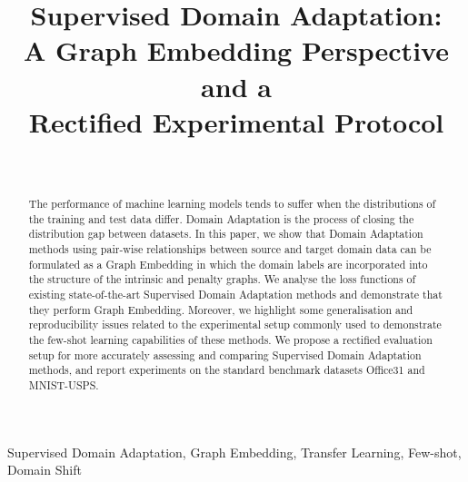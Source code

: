 \documentclass[journal]{IEEEtran}
\begin{document}
\title{Supervised Domain Adaptation:\\A Graph Embedding Perspective and a\\Rectified Experimental Protocol}





\author{
    \\
}





\maketitle



\begin{abstract}
The performance of machine learning models tends to suffer when the distributions of the training and test data differ. Domain Adaptation is the process of closing the distribution gap between datasets. 
In this paper, we show that Domain Adaptation methods using pair-wise relationships between source and target domain data can be formulated as a Graph Embedding in which the domain labels are incorporated into the structure of the intrinsic and penalty graphs.
We analyse the loss functions of existing state-of-the-art Supervised Domain Adaptation methods and demonstrate that they perform Graph Embedding. 
Moreover, we highlight some generalisation and reproducibility issues related to the experimental setup commonly used to demonstrate the few-shot learning capabilities of these methods. We propose a rectified evaluation setup for more accurately assessing and comparing Supervised Domain Adaptation methods, and report experiments on the standard benchmark datasets Office31 and MNIST-USPS.
\end{abstract}

\begin{IEEEkeywords}
Supervised Domain Adaptation, Graph Embedding, Transfer Learning, Few-shot, Domain Shift
\end{IEEEkeywords}


%
 
\end{document}
